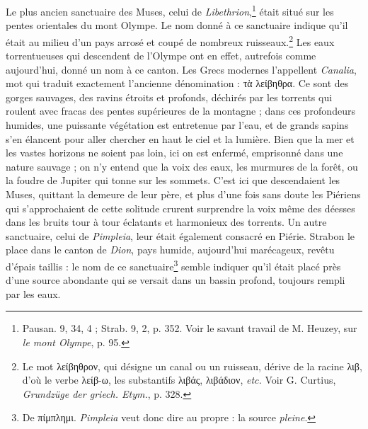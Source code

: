 \documentclass[landscape, a4paper, 11pt, oneside, polutonikogreek, french]{article}
\begin{document}
Le plus ancien sanctuaire des Muses, celui de \emph{Libethrion},\footnote{Pausan. 9, 34, 4 ; Strab. 9, 2, p. 352. Voir le savant travail de M. Heuzey, sur \emph{le mont Olympe}, p. 95.} était situé sur les pentes orientales du mont Olympe. Le nom donné à ce sanctuaire indique qu'il était au milieu d'un pays arrosé et coupé de nombreux ruisseaux.\footnote{Le mot λείβηθρον, qui désigne un canal ou un ruisseau, dérive de la racine λιβ, d'où le verbe λείβ-ω, les substantifs λιβάς, λιβάδιον, \emph{etc.} Voir G. Curtius, \emph{Grundzüge der griech. Etym.}, p. 328.} Les eaux torrentueuses qui descendent de l'Olympe ont en effet, autrefois comme aujourd'hui, donné un nom à ce canton. Les Grecs modernes l'appellent \emph{Canalia}, mot qui traduit exactement l'ancienne dénomination : τὰ λείβηθρα. Ce sont des gorges sauvages, des ravins étroits et profonds, déchirés par les torrents qui roulent avec fracas des pentes supérieures de la montagne ; dans ces profondeurs humides, une puissante végétation est entretenue par l'eau, et de grands sapins s'en élancent pour aller chercher en haut le ciel et la lumière. Bien que la mer et les vastes horizons ne soient pas loin, ici on est enfermé, emprisonné dans une nature sauvage ; on n'y entend que la voix des eaux, les murmures de la forêt, ou la foudre de Jupiter qui tonne sur les sommets. C'est ici que descendaient les Muses, quittant la demeure de leur père, et plus d'une fois sans doute les Piériens qui s'approchaient de cette solitude crurent surprendre la voix même des déesses dans les bruits tour à tour éclatants et harmonieux des torrents. Un autre sanctuaire, celui de \emph{Pimpleia}, leur était également consacré en Piérie. Strabon le place dans le canton de \emph{Dion}, pays humide, aujourd'hui marécageux, revêtu d'épais taillis : le nom de ce sanctuaire\footnote{De πίμπλημι. \emph{Pimpleia} veut donc dire au propre : la source \emph{pleine}.} semble indiquer qu'il était placé près d'une source abondante qui se versait dans un bassin profond, toujours rempli par les eaux.
\end{document}

